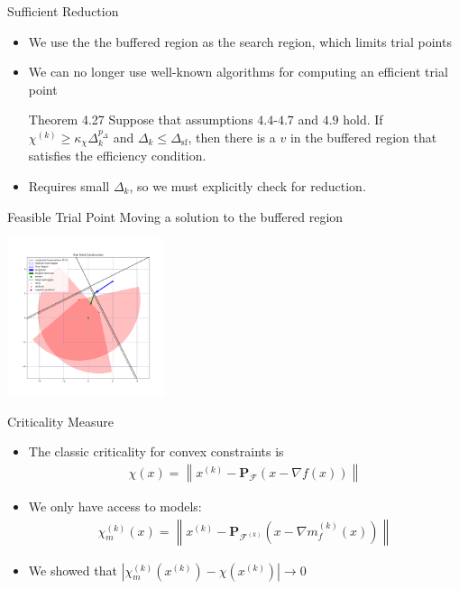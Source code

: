 \documentclass{beamer}
\newcommand{\xk}{{{x}^{(k)}}}
\newcommand{\feasible}{\mathcal F}
\newcommand{\feasiblek}{\mathcal F^{(k)}}
\newcommand{\proj}{\textbf{P}}
\begin{document}
\begin{frame}{Sufficient Reduction}
	\begin{itemize}
		\item We use the the buffered region as the search region, which limits trial points
		\item We can no longer use well-known algorithms for computing an efficient trial point
		\begin{block}{Theorem 4.27}
			Suppose that assumptions $4.4$-$4.7$ and $4.9$ hold.
			If $\chi^{(k)} \ge \kappa_{\chi} \Delta_k^{p_{\Delta}}$ and $\Delta_k \le \Delta_{\textrm{sf}}$,
			then there is a $v$ in the buffered region that satisfies the efficiency condition.
		\end{block}
		\item Requires small $\Delta_k$, so we must explicitly check for reduction.
		
	\end{itemize}
\end{frame}


\begin{frame}{Feasible Trial Point}
	Moving a solution to the buffered region
	\begin{center}
		\includegraphics[width=175px]{images/trial_point_constructions.png}
	\end{center}
\end{frame}


\begin{frame}{Criticality Measure}
	\begin{itemize}
		\item The classic criticality for convex constraints is
\begin{align*}
\chi(x) = \left\|\xk - \proj_{\feasible}\left(x - \nabla f(x)\right)\right\|
\end{align*}
		\item We only have access to models:
\begin{align*}
\chi_m^{(k)}(x) = \left\|\xk - \proj_{\feasiblek}\left(x - \nabla m_f^{(k)}(x)\right)\right\|
\end{align*}
		\item We showed that $\left|\chi_m^{(k)}\left(\xk\right) - \chi\left(\xk\right)\right| \to 0$ 
	\end{itemize}
\end{frame}
\end{document}
